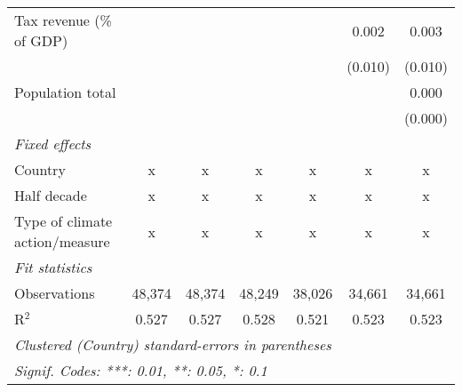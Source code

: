 \begin{tabular}{lcccccc}
   Tax revenue (\% of GDP)               &         &              &              &                & 0.002          & 0.003\\   
                                         &         &              &              &                & (0.010)        & (0.010)\\   
   Population total                      &         &              &              &                &                & 0.000\\   
                                         &         &              &              &                &                & (0.000)\\   
   \emph{Fixed effects}\\
   Country                               & x       & x            & x            & x              & x              & x\\  
   Half decade                           & x       & x            & x            & x              & x              & x\\  
   Type of climate action/measure        & x       & x            & x            & x              & x              & x\\  
   \midrule \emph{Fit statistics}\\
   Observations                          & 48,374  & 48,374       & 48,249       & 38,026         & 34,661         & 34,661\\  
   R$^2$                                 & 0.527   & 0.527        & 0.528        & 0.521          & 0.523          & 0.523\\  
   \midrule
   \multicolumn{7}{l}{\emph{Clustered (Country) standard-errors in parentheses}}\\
   \multicolumn{7}{l}{\emph{Signif. Codes: ***: 0.01, **: 0.05, *: 0.1}}\\
\end{tabular}
\par\endgroup



